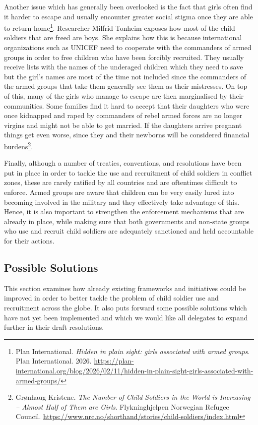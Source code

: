 Another issue which has generally been overlooked is the fact that girls often find it harder to escape and usually encounter greater social stigma once they are able to return home\footnote{Plan International. \emph{Hidden in plain sight: girls associated with armed groups}. Plan International. 2026. \url{https://plan-international.org/blog/2026/02/11/hidden-in-plain-sight-girls-associated-with-armed-groups/}}. Researcher Milfrid Tonheim exposes how most of the child soldiers that are freed are boys. She explains how this is because international organizations such as UNICEF need to cooperate with the commanders of armed groups in order to free children who have been forcibly recruited. They usually receive lists with the names of the underaged children which they need to save but the girl’s names are most of the time not included since the commanders of the armed groups that take them generally see them as their mistresses. On top of this, many of the girls who manage to escape are then marginalised by their communities. Some families find it hard to accept that their daughters who were once kidnapped and raped by commanders of rebel armed forces are no longer virgins and might not be able to get married. If the daughters arrive pregnant things get even worse, since they and their newborns will be considered financial burdens\footnote{Grønhaug Kristene. \emph{The Number of Child Soldiers in the World is Increasing – Almost Half of Them are Girls}. Flykninghjelpen Norwegian Refugee Council. \url{https://www.nrc.no/shorthand/stories/child-soldiers/index.html}}.

Finally, although a number of treaties, conventions, and resolutions have been put in place in order to tackle the use and recruitment of child soldiers in conflict zones, these are rarely ratified by all countries and are oftentimes difficult to enforce. Armed groups are aware that children can be very easily lured into becoming involved in the military and they effectively take advantage of this. Hence, it is also important to strengthen the enforcement mechanisms that are already in place, while making sure that both governments and non-state groups who use and recruit child soldiers are adequately sanctioned and held accountable for their actions.

\subsection{Possible Solutions}

This section examines how already existing frameworks and initiatives could be improved in order to better tackle the problem of child soldier use and recruitment across the globe. It also puts forward some possible solutions which have not yet been implemented and which we would like all delegates to expand further in their draft resolutions.

